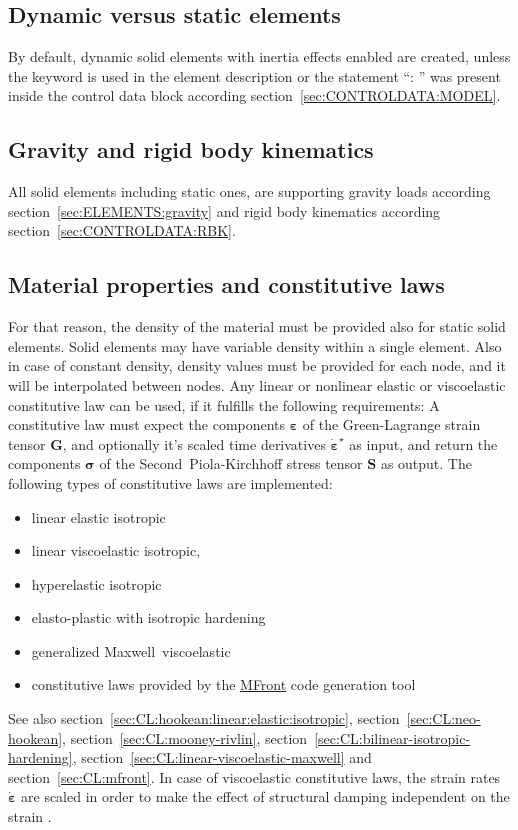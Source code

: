 \subsection{Dynamic versus static elements}
By default, dynamic solid elements with inertia effects enabled are created,
unless the keyword  is used in the element description
or the statement ``: '' was present inside the control data block according section~\ref{sec:CONTROLDATA:MODEL}.
\subsection{Gravity and rigid body kinematics}
All solid elements including static ones, are supporting gravity loads according section~\ref{sec:ELEMENTS:gravity}
and rigid body kinematics according section~\ref{sec:CONTROLDATA:RBK}.
\subsection{Material properties and constitutive laws}
For that reason, the density of the material must be provided also for static solid elements.
Solid elements may have variable density within a single element.
Also in case of constant density, density values must be provided for each node, and it will be interpolated between nodes.
Any linear or nonlinear elastic or viscoelastic constitutive law can be used, if it fulfills the following requirements:
A constitutive law must expect the components $\boldsymbol{\varepsilon}$ of the Green-Lagrange strain tensor $\boldsymbol{G}$,
and optionally it's scaled time derivatives $\dot{\boldsymbol{\varepsilon}}^{\star}$ as input, and return the components $\boldsymbol{\sigma}$
of the Second~Piola-Kirchhoff stress tensor $\boldsymbol{S}$ as output. The following types of constitutive laws are implemented:
\begin{itemize}
\item linear elastic isotropic
\item linear viscoelastic isotropic,
\item hyperelastic isotropic
\item elasto-plastic with isotropic hardening
\item generalized Maxwell~viscoelastic
\item constitutive laws provided by the \href{thelfer.github.io/tfel/web/index.html}{MFront} code generation tool
\end{itemize}
See also section~\ref{sec:CL:hookean:linear:elastic:isotropic}, section~\ref{sec:CL:neo-hookean}, section~\ref{sec:CL:mooney-rivlin},
section~\ref{sec:CL:bilinear-isotropic-hardening}, section~\ref{sec:CL:linear-viscoelastic-maxwell} and section~\ref{sec:CL:mfront}.
In case of viscoelastic constitutive laws, the strain rates $\dot{\boldsymbol{\varepsilon}}$ are scaled in order to make
the effect of structural damping independent on the strain \cite{KUEBLER2005}.

